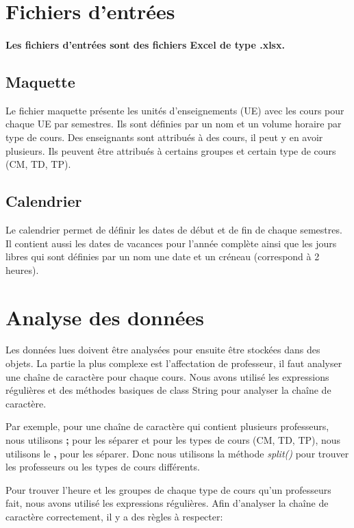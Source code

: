 \documentclass{polytech/polytech}
\begin{document}
	\section{Fichiers d'entrées}

	\paragraph{Les fichiers d'entrées sont des fichiers Excel de type .xlsx.}

	\subsection{Maquette}

	Le fichier maquette présente les unités d'enseignements (UE) avec les cours pour chaque UE par semestres.
	Ils sont définies par un nom et un volume horaire par type de cours.
	Des enseignants sont attribués à des cours, il peut y en avoir plusieurs.
	Ils peuvent être attribués à certains groupes et certain type de cours (CM, TD, TP).

	\subsection{Calendrier}

	Le calendrier permet de définir les dates de début et de fin de chaque semestres.
	Il contient aussi les dates de vacances pour l'année complète ainsi que les jours libres qui sont définies par un nom une date et un créneau (correspond à 2 heures).

	\section{Analyse des données}
	\label{format}
	Les données lues doivent être analysées pour ensuite être stockées dans des objets.
	La partie la plus complexe est l'affectation de professeur, il faut analyser une chaîne de caractère pour chaque cours.
	Nous avons utilisé les expressions régulières et des méthodes basiques de class String pour analyser la chaîne de caractère.

	Par exemple, pour une chaîne de caractère qui contient plusieurs professeurs, nous utilisons \textbf{;} pour les séparer et pour les types de cours (CM, TD, TP), nous utilisons le \textbf{,} pour les séparer.
	Donc nous utilisons la méthode \textit{split()} pour trouver les professeurs ou les types de cours différents.

	Pour trouver l'heure et les groupes de chaque type de cours qu'un professeurs fait, nous avons utilisé les expressions régulières.
	Afin d'analyser la chaîne de caractère correctement, il y a des règles à respecter:
\end{document}
